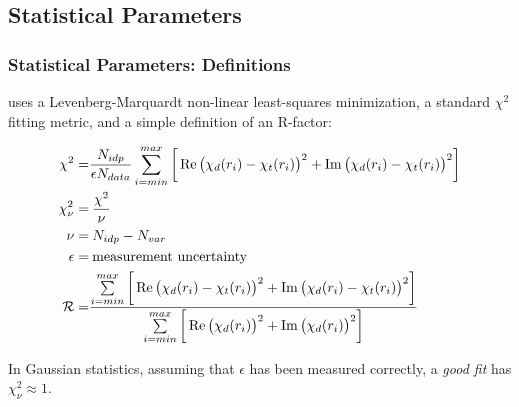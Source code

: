 \documentclass[10pt, xcolor=x11names, compress]{beamer}
\begin{document}
\subsection[Parameters]{Statistical Parameters}
\begin{frame}
  \frametitle{Statistical Parameters: Definitions}
  
  {\artemis} uses a Levenberg-Marquardt non-linear least-squares
  minimization, a standard $\chi^2$ fitting metric, and a simple
  definition of an R-factor:

  {\small
    \begin{align}
      \chi^2      =& \frac{N_{idp}}{\epsilon N_{data}}
                     \sum\limits_{i=min}^{max} 
                       \bigg[\Re\big(\chi_d(r_i)-\chi_t(r_i)\big)^2 + 
                             \Im\big(\chi_d(r_i)-\chi_t(r_i)\big)^2\bigg]
                     \label{eq:chisqr} \\
      \chi_\nu^2  =& \> \frac{\chi^2}{\nu} \label{eq:chinu} \\
      \nu         =& \> N_{idp} - N_{var} \label{eq:nu} \\
      \epsilon    =& \> \textrm{measurement uncertainty} \notag \\
      \mathcal{R} =& \frac{\sum\limits_{i=min}^{max} 
                             \bigg[\Re\big(\chi_d(r_i)-\chi_t(r_i)\big)^2 + 
                                   \Im\big(\chi_d(r_i)-\chi_t(r_i)\big)^2\bigg]}
                          {\sum\limits_{i=min}^{max} 
                             \bigg[\Re\big(\chi_d(r_i)\big)^2 + 
                                   \Im\big(\chi_d(r_i)\big)^2\bigg]} 
                     \label{eq:rfactor}
    \end{align}
  }
  \begin{block}{}
    In Gaussian statistics, assuming that $\epsilon$ has been measured
    correctly, a \textit{good fit} has $\chi_\nu^2\approx1$.
  \end{block}
\end{frame}
\end{document}

